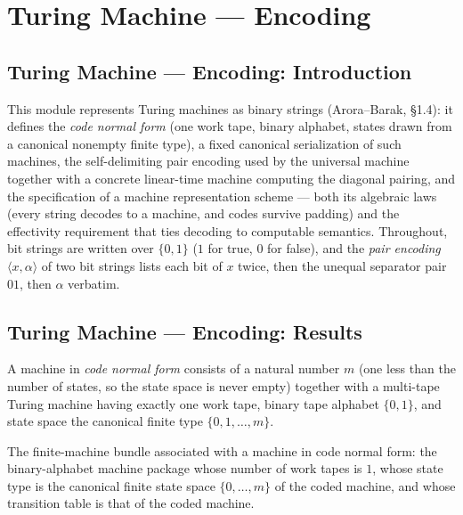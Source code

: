 \section{Turing Machine --- Encoding}
\subsection*{Turing Machine --- Encoding: Introduction}

This module represents Turing machines as binary strings (Arora--Barak,
\S 1.4): it defines the \emph{code normal form} (one work tape, binary
alphabet, states drawn from a canonical nonempty finite type), a fixed
canonical serialization of such machines, the self-delimiting pair encoding
used by the universal machine together with a concrete linear-time machine
computing the diagonal pairing, and the specification of a machine
representation scheme --- both its algebraic laws (every string decodes to a
machine, and codes survive padding) and the effectivity requirement that ties
decoding to computable semantics.  Throughout, bit strings are written over
$\{0,1\}$ ($1$ for true, $0$ for false), and the \emph{pair encoding}
$\langle x, \alpha\rangle$ of two bit strings lists each bit of $x$ twice,
then the unequal separator pair $01$, then $\alpha$ verbatim.

\subsection*{Turing Machine --- Encoding: Results}

\begin{definition}
\label{Turing.CodeTM}
\leanok
{}
A machine in \emph{code normal form} consists of a natural number $m$ (one
less than the number of states, so the state space is never empty) together
with a multi-tape Turing machine having exactly one work tape, binary tape
alphabet $\{0,1\}$, and state space the canonical finite type
$\{0, 1, \dots, m\}$.
\end{definition}

\begin{definition}
\label{Turing.CodeTM.toFinTM}
\leanok
{}
The finite-machine bundle associated with a machine in code normal form: the
binary-alphabet machine package whose number of work tapes is $1$, whose
state type is the canonical finite state space $\{0,\dots,m\}$ of the coded
machine, and whose transition table is that of the coded machine.
\end{definition}

